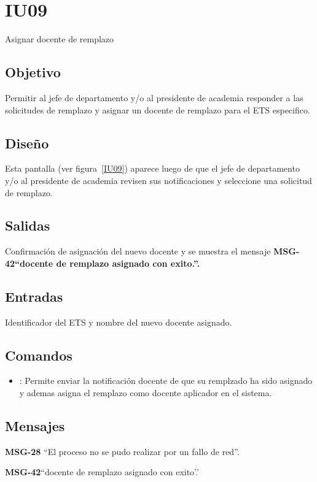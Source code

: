\section{IU09}{Asignar docente de remplazo}

\subsection{Objetivo}
Permitir al jefe de departamento y/o al presidente de academia responder a las solicitudes de remplazo y asignar un docente de remplazo para el ETS especifico.

\subsection{Diseño}
Esta pantalla  (ver figura~\ref{IU09}) aparece luego de que el jefe de departamento y/o al presidente de academia revisen sus notificaciones y seleccione una solicitud de remplazo.


\subsection{Salidas}
Confirmación de asignación del nuevo docente y se muestra el mensaje \bf MSG-42{``docente de remplazo asignado con exito.''}.

\subsection{Entradas}
Identificador del ETS y nombre del nuevo docente asignado.

\subsection{Comandos}
\begin{itemize}
	\item {}: Permite enviar la notificación docente de que su remplzado ha sido asignado y ademas asigna el remplazo como docente aplicador en el sistema.
\end{itemize}

\subsection{Mensajes}

\begin{Citemize}
	\item {\bf MSG-28} {``El proceso no se pudo realizar por un fallo de red''.}
	\item {\bf MSG-42}{``docente de remplazo asignado con exito'.'}
\end{Citemize}


